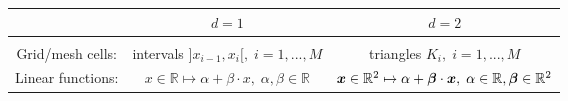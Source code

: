 \begin{tabular}{ccc}
	& $d=1$ & $d=2$\\
	\hline\\[0.5ex]
	Grid/mesh cells:  & intervals $]x_{i-1},x_i[,\; i=1,...,M$
	& triangles $K_i,\; i=1,...,M$\\[10pt]
	Linear functions: & $x\in\mathbb{R}\mapsto\alpha+\beta\cdot x,\;
	\alpha,\beta\in \mathbb{R}$ & 
	$\bm{x}\in\mathbb{R}^2 \mapsto \alpha+\bm{\beta}\cdot\bm{x},\;
	\alpha\in\mathbb{R},\bm{\beta}\in\mathbb{R}^2$
\end{tabular}